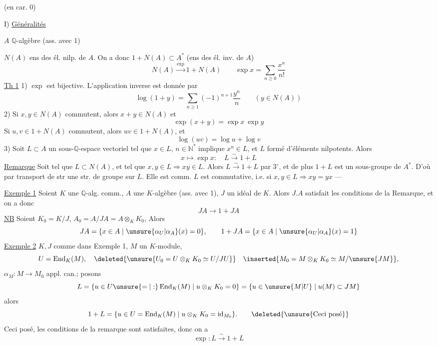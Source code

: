 \uline{} (en car. 0)

I) \uline{Généralités}

$A$ $\mathbb{Q}$-algèbre (ass. avec 1)

$N(A)$ ens des él. nilp. de $A$. On a donc $1+N(A)\subset A^*$ (ens des él. inv. de $A$)
\[
N(A)\xrightarrow{\exp}1+N(A)\qquad\exp x=\sum_{n\geq0}\frac{x^n}{n!}
\]
\uline{Th 1} 1) $\exp$ est bijective. L'application inverse est donnée par
\[
\log(1+y)=\sum_{n\geq1}(-1)^{n+1}\frac{y^n}{n}\qquad(y\in N(A))
\]
2) Si $x,y\in N(A)$ commutent, alors $x+y\in N(A)$ et
\[
\exp(x+y)=\exp x\ \exp y
\]
Si $u,v\in1+N(A)$ commutent, alors $uv\in1+N(A)$, et
\[
\log(uv)=\log u+\log v
\]
3) Soit $L\subset A$ un sous-$\mathbb{Q}$-espace vectoriel tel que $x\in L$, $n\in\mathbb{N}^*$ implique $x^n\in L$,  et $L$ formé d'éléments nilpotents. Alors
\[
x\longmapsto\exp x:\quad L\xrightarrow{\sim}1+L
\]
\uline{Remarque} Soit   tel que $L\subset N(A)$, et tel que $x,y\in L\Rightarrow xy\in L$. Alors $L\xrightarrow{\sim}1+L$ par $3^\circ$, et de plus $1+L$ est un sous-groupe de $A^*$. D'où par transport de str une str. de groupe sur $L$. Elle est comm.  $L$ est commutative, i.e. si $x,y\in L\Rightarrow xy=yx$ --- 

\uline{Exemple 1} Soient $K$ une $\mathbb{Q}$-alg. comm., $A$ une $K$-algèbre (ass. avec 1), $J$ un   idéal de $K$. Alors $J.A$ satisfait les conditions de la Remarque, et on a donc
\[
JA\longrightarrow1+JA
\]
\uline{NB} Soient $K_0=K/J$, $A_0=A/JA=A\otimes_KK_0$,  Alors 
\[
JA=\{x\in A\mid\unsure{\alpha_U|\alpha_A}(x)=0\},\qquad1+JA=\{x\in A\mid\unsure{\alpha_U|\alpha_A}(x)=1\}
\]
\uline{Exemple 2} $K,J$ comme dans Exemple 1,  $M$ un $K$-module,
\[
U=\operatorname{End}_K(M),\quad
\deleted{\unsure{U_0=U\otimes_KK_0\simeq U/JU}}\quad
\inserted{M_0=M\otimes_KK_0\simeq M/\unsure{JM}},
\]
$\alpha_M:M\longrightarrow M_0$ appl. can.; posons
\[
L=\{u\in U\unsure{=|:}\operatorname{End}_K(M)\mid u\otimes_KK_0=0\}
=\{u\in\unsure{M|U}\mid u(M)\subset JM\}
\]
alors
\[
1+L=\{u\in U=\operatorname{End}_K(M)\mid u\otimes_KK_0=\operatorname{id}_{M_0}\}.
\qquad\deleted{\unsure{\text{Ceci posé}}}
\]
Ceci posé, les conditions de la remarque sont satisfaites, donc on a
\[
\exp:L\xrightarrow{\sim}1+L
\]
